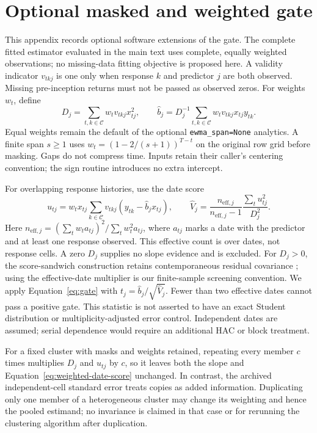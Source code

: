\documentclass[11pt,a4paper]{article}
\begin{document}
\section{Optional masked and weighted gate}\label{app:weighted-gate}

This appendix records optional software extensions of the gate. The complete
fitted estimator evaluated in the main text uses complete, equally weighted
observations; no missing-data fitting objective is proposed here. A validity
indicator $v_{tkj}$ is one only when response $k$ and predictor $j$ are both
observed. Missing pre-inception returns must not be passed as observed zeros.
For weights $w_t$, define
\begin{equation}
D_j=\sum_{t,k\in\mathcal C}w_tv_{tkj}x_{tj}^{2},\qquad
\widehat b_j=D_j^{-1}\sum_{t,k\in\mathcal C}w_tv_{tkj}x_{tj}y_{tk}.
\end{equation}
Equal weights remain the default of the optional \texttt{ewma\_span=None}
analytics. A finite span $s\geq1$ uses $w_t=(1-2/(s+1))^{T-t}$ on the original
row grid before masking. Gaps do not compress time. Inputs retain their caller's
centering convention; the sign routine introduces no extra intercept.

For overlapping response histories, use the date score
\begin{equation}
u_{tj}=w_tx_{tj}\sum_{k\in\mathcal C}v_{tkj}(y_{tk}-\widehat b_jx_{tj}),\qquad
\widehat V_j=\frac{n_{\mathrm{eff},j}}{n_{\mathrm{eff},j}-1}
\frac{\sum_tu_{tj}^{2}}{D_j^{2}}.\label{eq:weighted-date-score}
\end{equation}
Here $n_{\mathrm{eff},j}=(\sum_tw_ta_{tj})^2/\sum_tw_t^2a_{tj}$, where
$a_{tj}$ marks a date with the predictor and at least one response observed.
This effective count is over dates, not response cells. A zero $D_j$ supplies no
slope evidence and is excluded. For $D_j>0$, the score-sandwich
construction retains contemporaneous residual covariance \citep{CameronMiller2015};
using the effective-date multiplier is our finite-sample screening convention.
We apply Equation~\eqref{eq:gate} with $t_j=\widehat b_j/\sqrt{\widehat V_j}$.
Fewer than two effective dates cannot pass a positive gate. This statistic is
not asserted to have an exact Student distribution or multiplicity-adjusted
error control. Independent dates are assumed; serial dependence would require
an additional HAC or block treatment.

For a fixed cluster with masks and weights retained, repeating every member
$c$ times multiplies $D_j$ and $u_{tj}$ by $c$, so it
leaves both the slope and Equation~\eqref{eq:weighted-date-score} unchanged. In contrast,
the archived independent-cell standard error treats copies as added information.
Duplicating only one member of a heterogeneous cluster may change its weighting
and hence the pooled estimand; no invariance is claimed in that case or for
rerunning the clustering algorithm after duplication.
\end{document}
